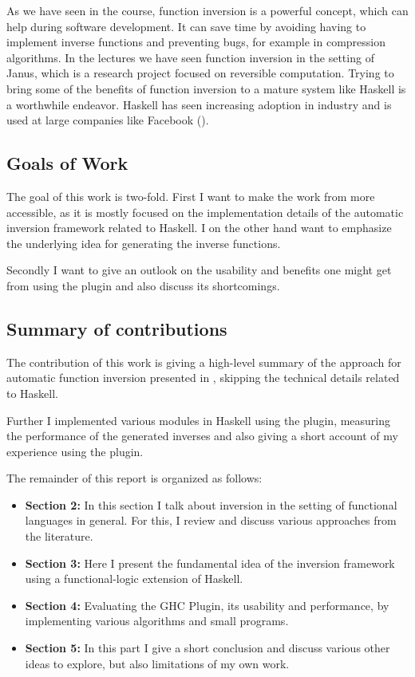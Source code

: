 \documentclass[12pt,a4paper, dvipsnames,usenames]{article}
\begin{document}
As we have seen in the course, function inversion
is a powerful concept, which can help during software development.
It can save time by avoiding having to implement inverse functions
and preventing bugs, for example in compression algorithms.
In the lectures we have seen function inversion in the setting of Janus,
which is a research project focused on reversible computation. Trying to bring
some of the benefits of function inversion to a mature system like Haskell is a
worthwhile endeavor. Haskell has seen increasing adoption in industry and
is used at large companies like Facebook (\cite{marlow2013haxl}).

\subsection{Goals of Work}

The goal of this work is two-fold. First I want to make the work from
\cite{teegen2021haskell} more accessible, as it is mostly focused on the
implementation details of the automatic inversion framework related to Haskell.
I on the other hand want to emphasize the underlying
idea for generating the inverse functions.

Secondly I want to give an outlook on the usability and benefits one might
get from using the plugin and also discuss its shortcomings.


\subsection{Summary of contributions}
The contribution of this work is giving a high-level summary of
the approach for automatic function inversion presented in \cite{teegen2021haskell},
skipping the technical details related to Haskell.

Further I implemented various modules in Haskell using the plugin,
measuring the performance of the generated inverses and also giving a short account
of my experience using the plugin.

The remainder of this report is organized as follows:

\begin{itemize}
\item \textbf{Section 2:} In this section I talk about inversion in the setting
of functional languages in general. For this, I review and discuss various approaches
from the literature.

\item \textbf{Section 3:} Here I present the fundamental idea of the
  inversion framework using a functional-logic extension of Haskell.

\item \textbf{Section 4:} Evaluating the GHC Plugin, its usability and performance,
  by implementing various algorithms and small programs.

\item \textbf{Section 5:} In this part I give a short conclusion and discuss
  various other ideas to explore, but also limitations of my own work.
\end{itemize}
\end{document}
